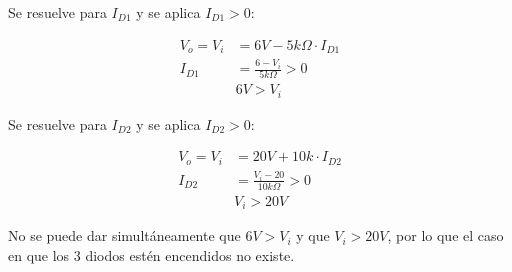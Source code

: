 \documentclass[12pt]{article}
\begin{document}
Se resuelve para $I_{D1}$ y se aplica $I_{D1} > 0$:

\begin{align*}
  V_o = V_i &= 6V - 5k\Omega \cdot I_{D1} \\
  I_{D1} &= \frac{6 - V_i}{5k\Omega} > 0 \\
  & 6V > V_i
\end{align*}

Se resuelve para $I_{D2}$ y se aplica $I_{D2} > 0$:

\begin{align*}
  V_o = V_i &= 20V + 10k \cdot I_{D2} \\
  I_{D2} &= \frac{V_i - 20}{10k\Omega} > 0 \\
  & V_i > 20V
\end{align*}

No se puede dar simultáneamente que $6V > V_i$ y que  $V_i > 20V$, por lo que el
caso en que los 3 diodos estén encendidos no existe.
\end{document}
